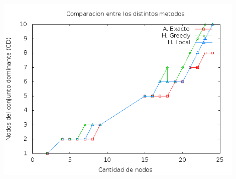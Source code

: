 \begin{center}
\includegraphics[width=12cm]{./graficos/local_comparacion_soluciones.png}
\end{center}